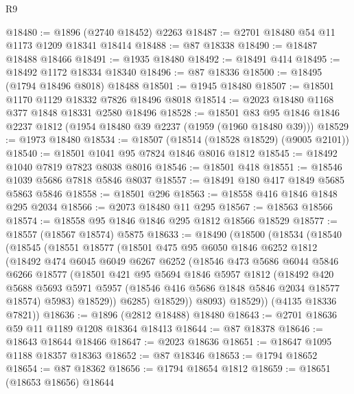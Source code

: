\begin{lexlean}{R9}
\begin{coremodule}
@18480 := @1896 (@2740 @18452) @2263
@18487 := @2701 @18480 @54 @11 @1173 @1209 @18341 @18414
@18488 := @87 @18338
@18490 := @18487 @18488 @18466
@18491 := @1935 @18480
@18492 := @18491 @414
@18495 := @18492 @1172 @18334 @18340
@18496 := @87 @18336
@18500 := @18495 (@1794 @18496 @8018) @18488
@18501 := @1945 @18480
@18507 := @18501 @1170 @1129 @18332 @7826 @18496 @8018
@18514 := @2023 @18480 @1168 @377 @1848 @18331 @2580 @18496
@18528 := @18501 @83 @95 @1846 @1846 @2237 @1812 (@1954 @18480 @39 @2237 (@1959 (@1960 @18480 @39)))
@18529 := @1973 @18480
@18534 := @18507 (@18514 (@18528 @18529) (@9005 @2101))
@18540 := @18501 @1041 @95 @7824 @1846 @8016 @1812
@18545 := @18492 @1040 @7819 @7823 @8038 @8016
@18546 := @18501 @418
@18551 := @18546 @1039 @5686 @7818 @5846 @8037
@18557 := @18491 @180 @417 @1849 @5685 @5863 @5846
@18558 := @18501 @296
@18563 := @18558 @416 @1846 @1848 @295 @2034
@18566 := @2073 @18480 @11 @295
@18567 := @18563 @18566
@18574 := @18558 @95 @1846 @1846 @295 @1812 @18566 @18529
@18577 := @18557 (@18567 @18574) @5875
@18633 := @18490
    (@18500
      (@18534
        (@18540
          (@18545
            (@18551
              @18577
              (@18501
                @475
                @95
                @6050
                @1846
                @6252
                @1812
                (@18492
                  @474
                  @6045
                  @6049
                  @6267
                  @6252
                  (@18546
                    @473
                    @5686
                    @6044
                    @5846
                    @6266
                    @18577
                    (@18501
                      @421
                      @95
                      @5694
                      @1846
                      @5957
                      @1812
                      (@18492
                        @420
                        @5688
                        @5693
                        @5971
                        @5957
                        (@18546 @416 @5686 @1848 @5846 @2034 @18577 @18574)
                        @5983)
                      @18529))
                  @6285)
                @18529))
            @8093)
          @18529))
      (@4135 @18336 @7821))
@18636 := @1896 (@2812 @18488) @18480
@18643 := @2701 @18636 @59 @11 @1189 @1208 @18364 @18413
@18644 := @87 @18378
@18646 := @18643 @18644 @18466
@18647 := @2023 @18636
@18651 := @18647 @1095 @1188 @18357 @18363
@18652 := @87 @18346
@18653 := @1794 @18652
@18654 := @87 @18362
@18656 := @1794 @18654 @1812
@18659 := @18651 (@18653 @18656) @18644

\end{coremodule}
\end{lexlean}
